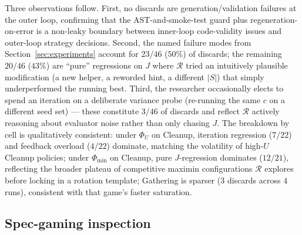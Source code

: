 \documentclass{article}
\begin{document}
Three observations follow. First, no discards are generation/validation failures at the outer loop, confirming that the AST-and-smoke-test guard plus regeneration-on-error is a non-leaky boundary between inner-loop code-validity issues and outer-loop strategy decisions. Second, the named failure modes from Section~\ref{sec:experiments} account for $23/46$ ($50\%$) of discards; the remaining $20/46$ ($43\%$) are ``pure'' regressions on $J$ where $\mathcal{R}$ tried an intuitively plausible modification (a new helper, a reworded hint, a different $|S|$) that simply underperformed the running best. Third, the researcher occasionally elects to spend an iteration on a deliberate variance probe (re-running the same $c$ on a different seed set) --- these constitute $3/46$ of discards and reflect $\mathcal{R}$ actively reasoning about evaluator noise rather than only chasing $J$. The breakdown by cell is qualitatively consistent: under $\Phi_U$ on Cleanup, iteration regression ($7/22$) and feedback overload ($4/22$) dominate, matching the volatility of high-$U$ Cleanup policies; under $\Phi_{\min}$ on Cleanup, pure $J$-regression dominates ($12/21$), reflecting the broader plateau of competitive maximin configurations $\mathcal{R}$ explores before locking in a rotation template; Gathering is sparser ($3$ discards across $4$ runs), consistent with that game's faster saturation.

\subsection{Spec-gaming inspection}
\label{app:specgaming}
\end{document}
